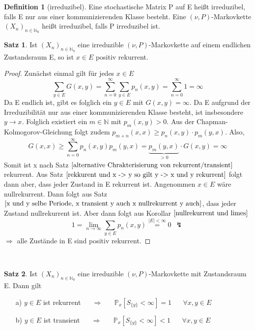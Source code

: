 \documentclass[a4paper,12pt]{scrartcl}
\theoremstyle{definition}
\newtheorem{sat}{Satz}[section]
\newtheorem{defi}{Definition}[section]
\begin{document}
\begin{defi}[irreduzibel]
Eine stochastische Matrix P auf E heißt irreduzibel, falls E nur aus einer kommunizierenden Klasse besteht. Eine $(\nu,P)$-Markovkette $(X_{n})_{n \in \mathbb{N}_{0}}$ heißt irreduzibel, falls P irreduzibel ist.
\end{defi}
\begin{sat}
\label{irr. Markovkette x positiv rekurrent}
Ist $(X_{n})_{n \in \mathbb{N}_{0}}$ eine irreduzible $(\nu,P)$-Markovkette auf einem endlichen Zustandsraum E, so ist $x \in E$ positiv rekurrent.
\end{sat}
\begin{proof}
Zunächst einmal gilt für jedes $x \in E$
\begin{equation*}
\sum_{y \in E}G(x,y) = \sum_{n=0}^{\infty} \sum_{y \in E} p_{n}(x,y) = \sum_{n=0}^{\infty} 1 = \infty
\end{equation*}
Da E endlich ist, gibt es folglich ein $y \in E$ mit $G(x,y) = \infty$. Da E aufgrund der Irreduzibilität nur aus einer kommunizierenden Klasse besteht, ist insbesondere $y \rightarrow x$. Folglich existiert ein $m \in \mathbb{N}$ mit $p_{m}(x,y)>0$. Aus der Chapman-Kolmogorov-Gleichung folgt zudem $p_{m+n}(x,x) \geq p_{n}(x,y) \cdot p_{m}(y,x)$. Also,
\begin{equation*}
G(x,x) \geq \sum_{n=0}^{\infty} p_{n}(x,y)p_{m}(y,x) = \underbrace{p_{m}(y,x)}_{>0} \cdot G(x,y) = \infty
\end{equation*}
Somit ist x nach Satz $\ref{alternative Chrakterisierung von rekurrent/transient}$ rekurrent. Aus Satz $\ref{rekkurent und x -> y so gilt y -> x und y rekurrent}$ folgt dann aber, dass jeder Zustand in E rekurrent ist. Angenommen $x \in E$ wäre nullrekurrent. Dann folgt aus Satz $\ref{x und y selbe Periode, x transient y auch x nullrekurrent y auch}$, dass jeder Zustand nullrekurrent ist. Aber dann folgt aus Korollar $\ref{nullrekurrent und limes}$
\begin{equation*}
1 = \lim_{n \to \infty} \sum_{y \in E} p_{n}(x,y) \stackrel{\vert E \vert < \infty}{=} 0 \: \: \lightning 
\end{equation*}
$\Rightarrow$ alle Zustände in E sind positiv rekurrent.  
\end{proof}
\mbox{}
\\
\begin{sat}
\label{irreduzibel, y rekurrent -> Px=1 , y transient -> Px<1 }
Ist $(X_{n})_{n \in \mathbb{N}_{0}}$ eine irreduzible $(\nu,P)$-Markovkette mit Zustandsraum E. Dann gilt
\begin{itemize}
\item[a)]$y \in E$ ist rekurrent $\quad$ $\Rightarrow$ $\quad$ $\mathbb{P}_{x}[S_{\lbrace y \rbrace} < \infty] = 1$ $\quad$ $\forall x,y \in E$ 
\item[b)]$y \in E$ ist transient $\quad$ $\Rightarrow$ $\quad$ $\mathbb{P}_{x}[S_{\lbrace y \rbrace} < \infty] < 1$ $\quad$ $\forall x,y \in E$  
\end{itemize}
\end{sat}
\end{document}
